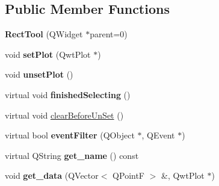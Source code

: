 \subsection*{Public Member Functions}
\begin{DoxyCompactItemize}
\item 
\mbox{\label{classRectTool_aa2ec592743f5be9366620cfcd76ac91a}} 
{\bfseries Rect\+Tool} (Q\+Widget $\ast$parent=0)
\item 
\mbox{\label{classRectTool_a0061642e759546f6dcd7c1a2c3b96393}} 
void {\bfseries set\+Plot} (Qwt\+Plot $\ast$)
\item 
\mbox{\label{classRectTool_a08ce587da86dc1b8335cb265bb2a3efd}} 
void {\bfseries unset\+Plot} ()
\item 
\mbox{\label{classRectTool_a1ce7bea2dcb7d122be6fd342720c986c}} 
virtual void {\bfseries finished\+Selecting} ()
\item 
virtual void \mbox{\hyperlink{classRectTool_a22ddb88797de61ed921a5cd3462383ea}{clear\+Before\+Un\+Set}} ()
\item 
\mbox{\label{classTool_a020bd5757a03ea7321848a3874f3a8cb}} 
virtual bool {\bfseries event\+Filter} (Q\+Object $\ast$, Q\+Event $\ast$)
\item 
\mbox{\label{classTool_aa30c64915020a71d0ea8650e8e966336}} 
virtual Q\+String {\bfseries get\+\_\+name} () const
\item 
\mbox{\label{classTool_a507adfcdafc818d9628b952001b93f3c}} 
void {\bfseries get\+\_\+data} (Q\+Vector$<$ Q\+PointF $>$ \&, Qwt\+Plot $\ast$)
\end{DoxyCompactItemize}
